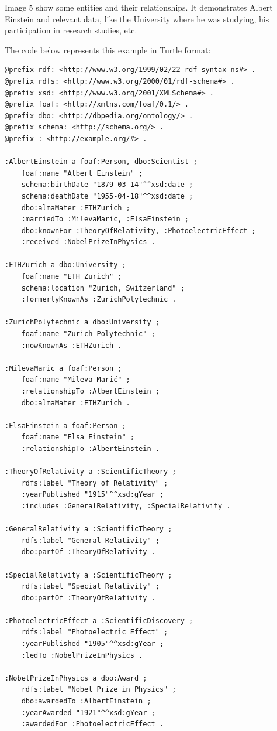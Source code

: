 Image 5 show some entities and their relationships. It demonstrates Albert Einstein and relevant data, like the University where he was studying, his participation in research studies, etc.

The code below represents this example in Turtle format:

{\footnotesize
\begin{verbatim}
@prefix rdf: <http://www.w3.org/1999/02/22-rdf-syntax-ns#> .
@prefix rdfs: <http://www.w3.org/2000/01/rdf-schema#> .
@prefix xsd: <http://www.w3.org/2001/XMLSchema#> .
@prefix foaf: <http://xmlns.com/foaf/0.1/> .
@prefix dbo: <http://dbpedia.org/ontology/> .
@prefix schema: <http://schema.org/> .
@prefix : <http://example.org/#> .

:AlbertEinstein a foaf:Person, dbo:Scientist ;
    foaf:name "Albert Einstein" ;
    schema:birthDate "1879-03-14"^^xsd:date ;
    schema:deathDate "1955-04-18"^^xsd:date ;
    dbo:almaMater :ETHZurich ;
    :marriedTo :MilevaMaric, :ElsaEinstein ;
    dbo:knownFor :TheoryOfRelativity, :PhotoelectricEffect ;
    :received :NobelPrizeInPhysics .

:ETHZurich a dbo:University ;
    foaf:name "ETH Zurich" ;
    schema:location "Zurich, Switzerland" ;
    :formerlyKnownAs :ZurichPolytechnic .

:ZurichPolytechnic a dbo:University ;
    foaf:name "Zurich Polytechnic" ;
    :nowKnownAs :ETHZurich .

:MilevaMaric a foaf:Person ;
    foaf:name "Mileva Marić" ;
    :relationshipTo :AlbertEinstein ;
    dbo:almaMater :ETHZurich .

:ElsaEinstein a foaf:Person ;
    foaf:name "Elsa Einstein" ;
    :relationshipTo :AlbertEinstein .

:TheoryOfRelativity a :ScientificTheory ;
    rdfs:label "Theory of Relativity" ;
    :yearPublished "1915"^^xsd:gYear ;
    :includes :GeneralRelativity, :SpecialRelativity .

:GeneralRelativity a :ScientificTheory ;
    rdfs:label "General Relativity" ;
    dbo:partOf :TheoryOfRelativity .

:SpecialRelativity a :ScientificTheory ;
    rdfs:label "Special Relativity" ;
    dbo:partOf :TheoryOfRelativity .

:PhotoelectricEffect a :ScientificDiscovery ;
    rdfs:label "Photoelectric Effect" ;
    :yearPublished "1905"^^xsd:gYear ;
    :ledTo :NobelPrizeInPhysics .

:NobelPrizeInPhysics a dbo:Award ;
    rdfs:label "Nobel Prize in Physics" ;
    dbo:awardedTo :AlbertEinstein ;
    :yearAwarded "1921"^^xsd:gYear ;
    :awardedFor :PhotoelectricEffect .

\end{verbatim}
}

